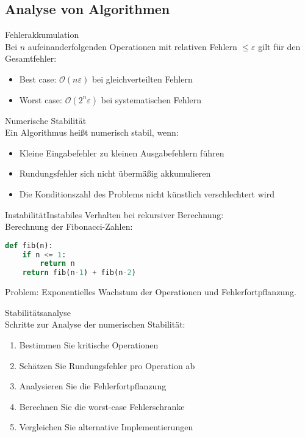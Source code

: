 \subsection{Analyse von Algorithmen}

\begin{theorem}{Fehlerakkumulation}\\
Bei $n$ aufeinanderfolgenden Operationen mit relativen Fehlern $\leq \varepsilon$ gilt für den Gesamtfehler:
\begin{itemize}
    \item Best case: $\mathcal{O}(n\varepsilon)$ bei gleichverteilten Fehlern
    \item Worst case: $\mathcal{O}(2^n\varepsilon)$ bei systematischen Fehlern
\end{itemize}
\end{theorem}

\begin{concept}{Numerische Stabilität}\\
Ein Algorithmus heißt numerisch stabil, wenn:
\begin{itemize}
    \item Kleine Eingabefehler zu kleinen Ausgabefehlern führen
    \item Rundungsfehler sich nicht übermäßig akkumulieren
    \item Die Konditionszahl des Problems nicht künstlich verschlechtert wird
\end{itemize}
\end{concept}

\begin{example2}{Instabilität}Instabiles Verhalten bei rekursiver Berechnung:\\
Berechnung der Fibonacci-Zahlen:
\begin{lstlisting}[language=Python, style=basesmol]
def fib(n):
    if n <= 1:
        return n
    return fib(n-1) + fib(n-2)
\end{lstlisting}
Problem: Exponentielles Wachstum der Operationen und Fehlerfortpflanzung.
\end{example2}

\begin{KR}{Stabilitätsanalyse}\\
Schritte zur Analyse der numerischen Stabilität:
\begin{enumerate}
    \item Bestimmen Sie kritische Operationen
    \item Schätzen Sie Rundungsfehler pro Operation ab
    \item Analysieren Sie die Fehlerfortpflanzung
    \item Berechnen Sie die worst-case Fehlerschranke
    \item Vergleichen Sie alternative Implementierungen
\end{enumerate}
\end{KR}

